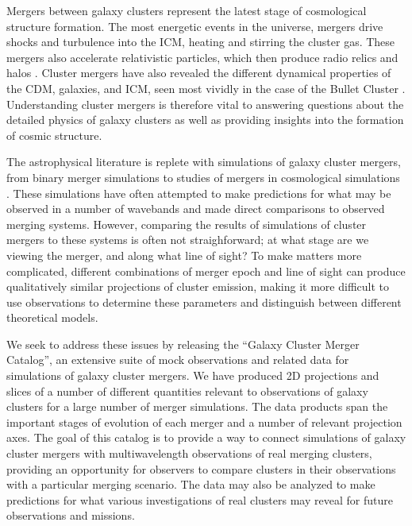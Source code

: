 \documentclass{emulateapj}
\begin{document}
Mergers between galaxy clusters represent the latest stage of cosmological structure formation. The most energetic events in the universe, mergers drive shocks and turbulence into the ICM, heating and stirring the cluster gas. These mergers also accelerate relativistic particles, which then produce radio relics and halos \citep{fer05,bru07,vwe10,bru12}. Cluster mergers have also revealed the different dynamical properties of the CDM, galaxies, and ICM, seen most vividly in the case of the Bullet Cluster \citep[][]{clo04,mar04}. Understanding cluster mergers is therefore vital to answering questions about the detailed physics of galaxy clusters as well
as providing insights into the formation of cosmic structure.

The astrophysical literature is replete with simulations of galaxy cluster mergers, from binary merger simulations \citep[e.g.][]{ric01,poo06,zuh11,don13} to studies of mergers in cosmological simulations \citep[e.g.][]{vaz09,ski13,yu15}. These simulations have often attempted to make predictions for what may be observed in a number of wavebands and made direct comparisons to observed merging systems. However, comparing the results of simulations of cluster mergers to these systems is often not straighforward; at what stage are we viewing the merger, and along what line of sight? To make matters more complicated, different combinations of merger epoch and line of sight can produce qualitatively similar projections of cluster emission, making it more difficult to use observations to determine these parameters and distinguish between different theoretical models.

We seek to address these issues by releasing the ``Galaxy Cluster Merger Catalog'', an extensive suite of mock observations and related data for simulations of galaxy cluster mergers. We have produced 2D projections and slices of a number of different quantities relevant to observations of galaxy clusters for a large number of merger simulations. The data products span the important stages of evolution of each merger and a number of relevant projection axes. The goal of this catalog is to provide a way to connect simulations of galaxy cluster mergers with multiwavelength observations of real merging clusters, providing an opportunity for observers to compare clusters in their observations with a particular merging scenario. The data may also be analyzed to make predictions for what various investigations of real clusters may reveal for future observations and missions.
\end{document}
